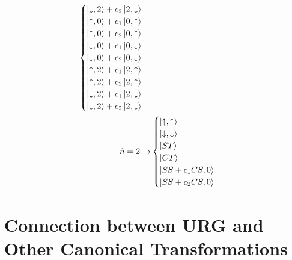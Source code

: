 \documentclass[12pt,twoside]{article}
\numberwithin{equation}{section}
\begin{document}
\begin{equation}
\begin{aligned}
\begin{cases}
	\ket{\downarrow,2} + c_2\ket{2, \downarrow}\\
	\ket{\uparrow,0} + c_1\ket{0, \uparrow}\\
	\ket{\uparrow,0} + c_2\ket{0, \uparrow}\\
	\ket{\downarrow,0} + c_1\ket{0, \downarrow}\\
	\ket{\downarrow,0} + c_2\ket{0, \downarrow}\\
	\ket{\uparrow,2} + c_1\ket{2, \uparrow}\\
	\ket{\uparrow,2} + c_2\ket{2, \uparrow}\\
	\ket{\downarrow,2} + c_1\ket{2, \downarrow}\\
	\ket{\downarrow,2} + c_2\ket{2, \downarrow}\\
\end{cases}\\
\hat n=2 \rightarrow &\begin{cases}
	\ket{\uparrow, \uparrow}\\
	\ket{\downarrow,\downarrow}\\
	\ket{ST}\\
	\ket{CT}\\
	\ket{SS+c_1 CS,0}\\
	\ket{SS+c_2 CS,0}\\
\end{cases}
\end{aligned}\end{equation}

\section{Connection between URG and Other Canonical Transformations}
\end{document}
